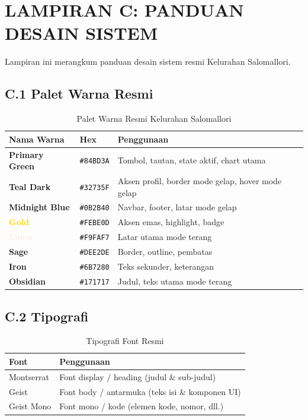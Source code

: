 \documentclass[12pt,a4paper]{report}
\begin{document}
\clearpage

\chapter{LAMPIRAN C: PANDUAN DESAIN SISTEM}

Lampiran ini merangkum panduan desain sistem resmi Kelurahan Salomallori.

\section*{C.1 Palet Warna Resmi}

\begin{table}[H]
    \centering
    \caption{Palet Warna Resmi Kelurahan Salomallori}
    \label{tab:palet}
    \begin{tabularx}{\textwidth}{l l X}
        \toprule
        \textbf{Nama Warna} & \textbf{Hex} & \textbf{Penggunaan} \\
        \midrule
        \textcolor{primarygreen}{\textbf{Primary Green}} & \texttt{\#84BD3A} & Tombol, tautan, state aktif, chart utama \\
        \textcolor{tealdark}{\textbf{Teal Dark}} & \texttt{\#32735F} & Aksen profil, border mode gelap, hover mode gelap \\
        \textcolor{midnight}{\textbf{Midnight Blue}} & \texttt{\#0B2B40} & Navbar, footer, latar mode gelap \\
        \textcolor{gold}{\textbf{Gold}} & \texttt{\#FEBE0D} & Aksen emas, highlight, badge \\
        \textcolor{linen}{\textbf{Linen}} & \texttt{\#F9FAF7} & Latar utama mode terang \\
        \textcolor{sage}{\textbf{Sage}} & \texttt{\#DEE2DE} & Border, outline, pembatas \\
        \textcolor{iron}{\textbf{Iron}} & \texttt{\#6B7280} & Teks sekunder, keterangan \\
        \textcolor{obsidian}{\textbf{Obsidian}} & \texttt{\#171717} & Judul, teks utama mode terang \\
        \bottomrule
    \end{tabularx}
\end{table}

\section*{C.2 Tipografi}

\begin{table}[H]
    \centering
    \caption{Tipografi Font Resmi}
    \label{tab:tipografi}
    \begin{tabularx}{\textwidth}{l X}
        \toprule
        \textbf{Font} & \textbf{Penggunaan} \\
        \midrule
        Montserrat & Font display / heading (judul \& sub-judul) \\
        Geist & Font body / antarmuka (teks isi \& komponen UI) \\
        Geist Mono & Font mono / kode (elemen kode, nomor, dll.) \\
        \bottomrule
    \end{tabularx}
\end{table}
\end{document}
